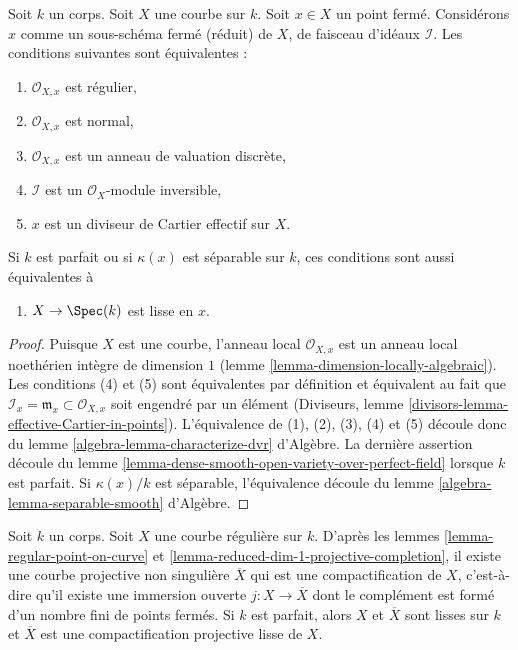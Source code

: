 \begin{lemma}
\label{lemma-regular-point-on-curve}
Soit $k$ un corps. Soit $X$ une courbe sur $k$. Soit $x \in X$ un point
fermé. Considérons $x$ comme un sous-schéma fermé (réduit) de $X$, de faisceau
d'idéaux $\mathcal{I}$. Les conditions suivantes sont équivalentes :
\begin{enumerate}
\item $\mathcal{O}_{X, x}$ est régulier,
\item $\mathcal{O}_{X, x}$ est normal,
\item $\mathcal{O}_{X, x}$ est un anneau de valuation discrète,
\item $\mathcal{I}$ est un $\mathcal{O}_X$-module inversible,
\item $x$ est un diviseur de Cartier effectif sur $X$.
\end{enumerate}
Si $k$ est parfait ou si $\kappa(x)$ est séparable sur $k$,
ces conditions sont aussi équivalentes à
\begin{enumerate}
\item[(6)] $X \to \Spec(k)$ est lisse en $x$.
\end{enumerate}
\end{lemma}

\begin{proof}
Puisque $X$ est une courbe, l'anneau local $\mathcal{O}_{X, x}$ est un anneau local
noethérien intègre de dimension $1$ (lemme \ref{lemma-dimension-locally-algebraic}).
Les conditions (4) et (5) sont équivalentes par définition et équivalent au fait que
$\mathcal{I}_x = \mathfrak m_x \subset \mathcal{O}_{X, x}$ soit engendré par un élément
(Diviseurs, lemme \ref{divisors-lemma-effective-Cartier-in-points}).
L'équivalence de (1), (2), (3), (4) et (5) découle donc du
lemme \ref{algebra-lemma-characterize-dvr} d'Algèbre. La dernière assertion
découle du lemme \ref{lemma-dense-smooth-open-variety-over-perfect-field}
lorsque $k$ est parfait. Si $\kappa(x)/k$ est séparable, l'équivalence
découle du lemme \ref{algebra-lemma-separable-smooth} d'Algèbre.
\end{proof}

\begin{remark}
\label{remark-smooth-projective-compactification}
Soit $k$ un corps. Soit $X$ une courbe régulière sur $k$. D'après les
lemmes \ref{lemma-regular-point-on-curve} et
\ref{lemma-reduced-dim-1-projective-completion},
il existe une courbe projective non singulière $\overline{X}$
qui est une compactification de $X$, c'est-à-dire qu'il existe une
immersion ouverte $j : X \to \overline{X}$ dont le complément
est formé d'un nombre fini de points fermés. Si $k$ est parfait,
alors $X$ et $\overline{X}$ sont lisses sur $k$ et
$\overline{X}$ est une compactification projective lisse de $X$.
\end{remark}

